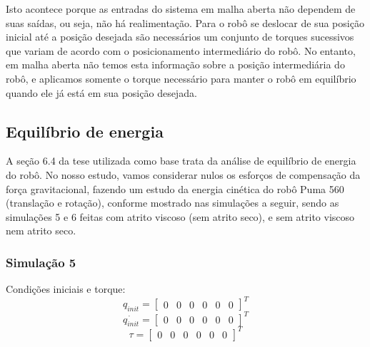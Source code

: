 \documentclass{article}
\begin{document}
Isto acontece porque as entradas do sistema em malha aberta não dependem de suas saídas, ou seja, não há realimentação. Para o robô se deslocar de sua  posição inicial até a posição desejada são necessários um conjunto de torques sucessivos que variam de acordo com o posicionamento intermediário do robô. No entanto, em malha aberta não temos esta informação sobre a posição intermediária do robô, e aplicamos somente o torque necessário para manter o robô em equilíbrio quando ele já está em sua posição desejada.

\subsection{Equilíbrio de energia}
A seção 6.4 da tese\cite{bb:tese} utilizada como base trata da análise de equilíbrio de energia do robô. No nosso estudo, vamos considerar nulos os esforços de compensação da força gravitacional, fazendo um estudo da energia cinética do robô Puma 560 (translação e rotação), conforme mostrado nas simulações a seguir, sendo as simulações 5 e 6 feitas com atrito viscoso (sem atrito seco), e sem atrito viscoso nem atrito seco.

\subsubsection{Simulação 5}
Condições iniciais e torque:
\begin{equation}
\label{eq:sim5q}
q_{init}=\begin{bmatrix}
0 & 0 & 0 & 0 & 0 & 0
\end{bmatrix}^T
\end{equation}
\begin{equation}
\label{eq:sim5qd}
\dot{q_{init}}=\begin{bmatrix}
0 & 0 & 0 & 0 & 0 & 0
\end{bmatrix}^T
\end{equation}
\begin{equation}
\label{eq:sim5tau}
\tau=\begin{bmatrix}
0 & 0 & 0 & 0 & 0 & 0
\end{bmatrix}^T
\end{equation}
\end{document}

